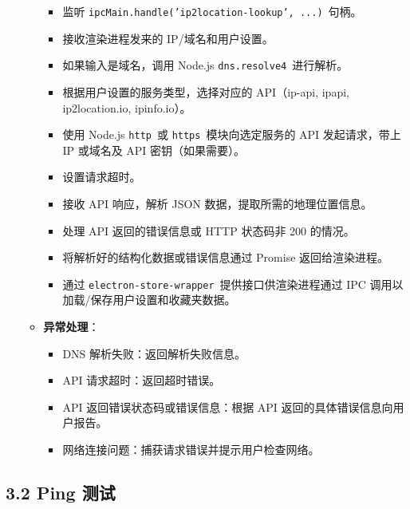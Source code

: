 \documentclass{article}
\begin{document}
\begin{itemize}
\begin{itemize}
\begin{itemize}
            \item 监听 \texttt{ipcMain.handle('ip2location-lookup', ...)}\ 句柄。
            \item 接收渲染进程发来的 IP/域名和用户设置。
            \item 如果输入是域名，调用 Node.js \texttt{dns.resolve4}\ 进行解析。
            \item 根据用户设置的服务类型，选择对应的 API（ip-api, ipapi, ip2location.io, ipinfo.io）。
            \item 使用 Node.js \texttt{http}\ 或 \texttt{https}\ 模块向选定服务的 API 发起请求，带上 IP 或域名及 API 密钥（如果需要）。
            \item 设置请求超时。
            \item 接收 API 响应，解析 JSON 数据，提取所需的地理位置信息。
            \item 处理 API 返回的错误信息或 HTTP 状态码非 200 的情况。
            \item 将解析好的结构化数据或错误信息通过 Promise 返回给渲染进程。
            \item 通过 \texttt{electron-store-wrapper}\ 提供接口供渲染进程通过 IPC 调用以加载/保存用户设置和收藏夹数据。
        \end{itemize}
        \item \textbf{异常处理}：
        \begin{itemize}
            \item DNS 解析失败：返回解析失败信息。
            \item API 请求超时：返回超时错误。
            \item API 返回错误状态码或错误信息：根据 API 返回的具体错误信息向用户报告。
            \item 网络连接问题：捕获请求错误并提示用户检查网络。
        \end{itemize}
    \end{itemize}
\end{itemize}

\subsection*{3.2 Ping 测试}
\end{document}
